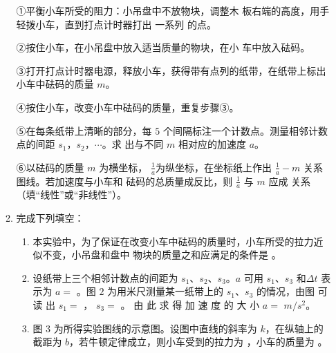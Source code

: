 \begin{enumerate}
\begin{enumerate}
①平衡小车所受的阻力：小吊盘中不放物块，调整木
板右端的高度，用手轻拨小车，直到打点计时器打出
一系列  的点。

②按住小车，在小吊盘中放入适当质量的物块，在小
车中放入砝码。


③打开打点计时器电源，释放小车，获得带有点列的纸带，在纸带上标出小车中砝码的质量 $ m $。


④按住小车，改变小车中砝码的质量，重复步骤③。


⑤在每条纸带上清晰的部分，每 $ 5 $ 个间隔标注一个计数点。测量相邻计数点的间距 $ s_{1} $，$ s_{2} $，$ \cdots $。求
出与不同 $ m $ 相对应的加速度 $ a $。



⑥以砝码的质量 $ m $ 为横坐标，
$\frac{1}{a}$为纵坐标，在坐标纸上作出 $\frac{1}{a}-m$ 关系图线。若加速度与小车和
砝码的总质量成反比，则
$\frac{1}{a}$
与 $ m $ 应成  关系（填“线性”或“非线性”）。


\item 
完成下列填空：
\begin{enumerate}
\renewcommand{\labelenumiii}{\roman{enumiii}.}
\item
本实验中，为了保证在改变小车中砝码的质量时，小车所受的拉力近似不变，小吊盘和盘中
物块的质量之和应满足的条件是  。


\item 
设纸带上三个相邻计数点的间距为 $ s_{1} $、$ s_{2} $、$ s_{3} $。$ a $ 可用 $ s_{1} $、$ s_{3} $ 和$ \Delta t $ 表
示为 $ a= $  。图 $ 2 $ 为用米尺测量某一纸带上的 $ s_{1} $、$ s_{3} $ 的情况，由图
可 读 出 $ s_{1}= $  ， $ s_{3}= $  。 由 此 求 得 加 速 度 的 大 小
$ a=$  $m/s^{2} $。
\begin{figure}[h!]
\centering

\end{figure}

\item 
图 $ 3 $ 为所得实验图线的示意图。设图中直线的斜率为 $ k $，在纵轴上的
截距为 $ b $，若牛顿定律成立，则小车受到的拉力为  ，小车的质量为  。
\begin{figure}[h!]
\centering

\end{figure}



\end{enumerate}
\end{enumerate}
\end{enumerate}
